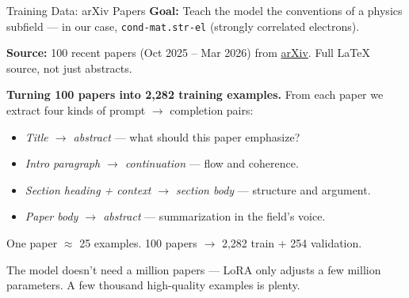 \documentclass[aspectratio=169]{beamer}
\begin{document}
\begin{frame}{Training Data: arXiv Papers}
    \textbf{Goal:} Teach the model the conventions of a physics subfield --- in our case, \texttt{cond-mat.str-el} (strongly correlated electrons).

    \vspace{0.5em}
    \textbf{Source:} 100 recent papers (Oct 2025 -- Mar 2026) from \href{https://arxiv.org}{arXiv}. Full LaTeX source, not just abstracts.

    \vspace{0.5em}
    \textbf{Turning 100 papers into 2{,}282 training examples.} From each paper we extract four kinds of prompt $\rightarrow$ completion pairs:
    \begin{itemize}
        \vspace{0.2em}
        \item \textit{Title $\rightarrow$ abstract} --- what should this paper emphasize?
        \item \textit{Intro paragraph $\rightarrow$ continuation} --- flow and coherence.
        \item \textit{Section heading + context $\rightarrow$ section body} --- structure and argument.
        \item \textit{Paper body $\rightarrow$ abstract} --- summarization in the field's voice.
    \end{itemize}

    \vspace{0.3em}
    One paper $\approx$ 25 examples. 100 papers $\rightarrow$ 2{,}282 train + 254 validation.

    \vspace{0.5em}
    The model doesn't need a million papers --- LoRA only adjusts a few million parameters. A few thousand high-quality examples is plenty.
\end{frame}
\end{document}
